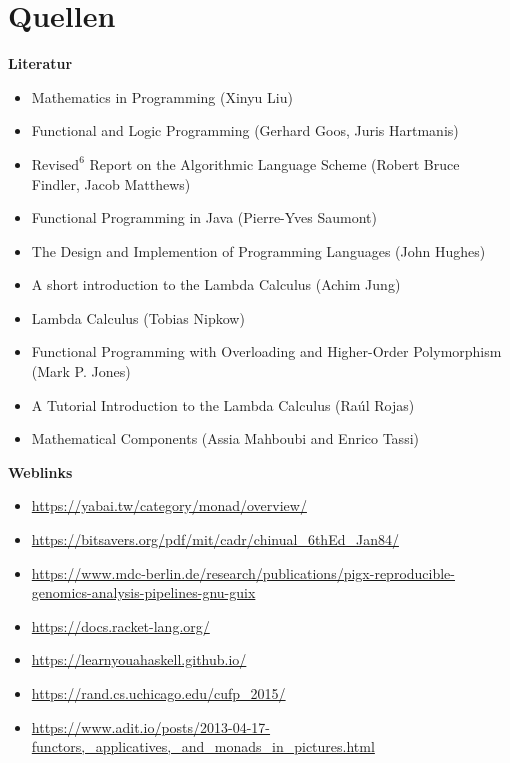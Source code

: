 \documentclass{beamer}
\begin{document}
	\section{Quellen}
\begin{frame}
	\fontsize{8pt}{10pt}
	\centering
	\textbf{Literatur}
	\begin{itemize}
    \item Mathematics in Programming (Xinyu Liu)
\item Functional and Logic Programming (Gerhard Goos, Juris Hartmanis)
\item $\text{Revised}^6$ Report on the Algorithmic Language
Scheme (Robert Bruce Findler, Jacob Matthews)
\item Functional Programming in Java (Pierre-Yves Saumont)
\item The Design and Implemention of Programming Languages (John Hughes)
\item A short introduction to the Lambda Calculus (Achim Jung)
\item Lambda Calculus (Tobias Nipkow) 
\item   Functional Programming with Overloading and
Higher-Order Polymorphism (Mark P. Jones)
\item A Tutorial Introduction to the Lambda Calculus (Raúl Rojas)
\item Mathematical Components (Assia Mahboubi and Enrico Tassi)
 \end{itemize}
 \textbf{Weblinks}
	\begin{itemize}
		\item \url{https://yabai.tw/category/monad/overview/}
        \item \url{https://bitsavers.org/pdf/mit/cadr/chinual_6thEd_Jan84/}
        \item \url{https://www.mdc-berlin.de/research/publications/pigx-reproducible-genomics-analysis-pipelines-gnu-guix}
        \item \url{https://docs.racket-lang.org/}
        \item \url{https://learnyouahaskell.github.io/}
        \item \url{https://rand.cs.uchicago.edu/cufp_2015/}
        \item \url{https://www.adit.io/posts/2013-04-17-functors,_applicatives,_and_monads_in_pictures.html}
	\end{itemize}
 
\end{frame}
\end{document}
